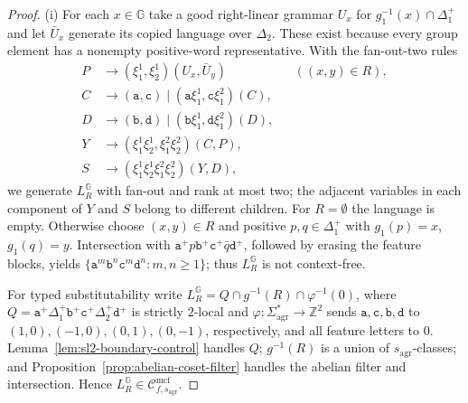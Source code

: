 \documentclass[11pt]{article}
\numberwithin{equation}{section}
\theoremstyle{plain}
\theoremstyle{definition}
\theoremstyle{remark}
\newcommand{\Cmcf}[2]{\mathcal{C}^{\mathrm{mcf}}_{#1,#2}}
\theoremstyle{plain}
\begin{document}
\begin{proof}
(i) For each $x\in {\mathbb G}$ take a good right-linear grammar $U_x$ for
$g_1^{-1}(x)\cap\Delta_1^+$ and let $\bar U_x$ generate its copied
language over $\Delta_2$.  These exist because every group element has
a nonempty positive-word representative.  With the fan-out-two rules
\[
\begin{aligned}
 P&\to(\xi_1^1,\xi_2^1)(U_x,\bar U_y) &&((x,y)\in R),\\
 C&\to(\mathtt a,\mathtt c)
       \mid(\mathtt a\xi_1^1,\mathtt c\xi_1^2)(C),\\
 D&\to(\mathtt b,\mathtt d)
       \mid(\mathtt b\xi_1^1,\mathtt d\xi_1^2)(D),\\
 Y&\to(\xi_1^1\xi_2^1,\xi_1^2\xi_2^2)(C,P),\\
 S&\to(\xi_1^1\xi_2^1\xi_1^2\xi_2^2)(Y,D),
\end{aligned}
\]
we generate $L_R^{\mathbb G}$ with fan-out and rank at most two; the adjacent
variables in each component of $Y$ and $S$ belong to different children.
For $R=\emptyset$ the language is empty.  Otherwise choose $(x,y)\in R$
and positive $p,q\in\Delta_1^+$ with $g_1(p)=x$, $g_1(q)=y$.
Intersection with
$\mathtt a^+p\mathtt b^+\mathtt c^+\bar q\mathtt d^+$,
followed by erasing the feature blocks, yields
$\{\mathtt a^m\mathtt b^n\mathtt c^m\mathtt d^n:m,n\ge1\}$;
thus $L_R^{\mathbb G}$ is not context-free.

For typed substitutability write
$L_R^{\mathbb G}=Q\cap g^{-1}(R)\cap\varphi^{-1}(0)$, where
$Q=\mathtt a^+\Delta_1^+\mathtt b^+\mathtt c^+
\Delta_2^+\mathtt d^+$ is strictly $2$-local and
$\varphi:\Sigma_{\mathrm{agr}}^*\to\mathbb Z^2$ sends
$\mathtt a,\mathtt c,\mathtt b,\mathtt d$ to
$(1,0),(-1,0),(0,1),(0,-1)$, respectively, and all feature letters
to $0$.  Lemma~\ref{lem:sl2-boundary-control} handles $Q$;
$g^{-1}(R)$ is a union of $s_{\mathrm{agr}}$-classes; and
Proposition~\ref{prop:abelian-coset-filter} handles the abelian
filter and intersection.  Hence $L_R^{\mathbb G}\in\Cmcf{f}{s_{\mathrm{agr}}}$.


\end{proof}
\end{document}
